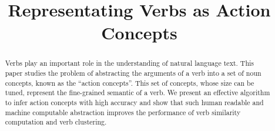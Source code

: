 \documentclass[11pt]{article}%
\begin{document}
\title{Representating Verbs as Action Concepts}

%


\maketitle
\begin{abstract}
Verbs play an important role in the understanding of natural
language text. This paper studies the problem of abstracting 
the arguments of a verb into a set of noun 
concepts, known as the ``action concepts''. 
This set of concepts, whose size can be tuned,
represent the fine-grained semantic of a verb. 
We present an effective algorithm
to infer action concepts with high accuracy and
show that such human readable and machine computable abstraction
improves the performance of verb similarity computation and verb clustering.
\end{abstract}
\end{document}
